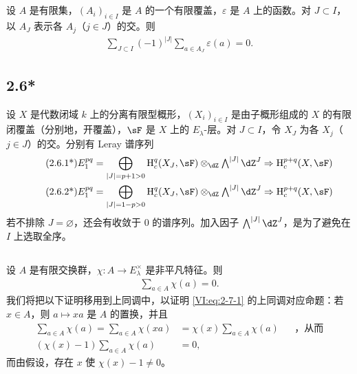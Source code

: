 \subsection{}\label{VI:2-6}

设 $A$ 是有限集，$(A_i)_{i\in I}$ 是 $A$ 的一个有限覆盖，$\varepsilon$ 是 $A$ 上的函数。对 $J\subset I$，以 $A_J$ 表示各 $A_j$（$j\in J$）的交。则
\begin{align*}\tag{2.6.1}\label{VI:eq:2-6-1}
  \sum_{J\subset I} (-1)^{|J|} \sum_{a\in A_J} \varepsilon(a) = 0 \text{.}
\end{align*}

\subsection*{2.6*}\label{VI:2-6*}

设 $X$ 是代数闭域 $k$ 上的分离有限型概形，$(X_i)_{i\in I}$ 是由子概形组成的 $X$ 的有限闭覆盖（分别地，开覆盖），$\sF$ 是 $X$ 上的 $E_\lambda$-层。对 $J\subset I$，令 $X_J$ 为各 $X_j$（$j\in J$）的交。分别有 Leray 谱序列
\begin{align*}\tag{2.6.1*}\label{VI:eq:2-6-1*}
  E_1^{p q} &= \bigoplus_{|J|=p+1>0} \h_c^q(X_J,\sF) \otimes_\dZ \textstyle\bigwedge^{|J|} \dZ^J \Rightarrow \h_c^{p+q}(X,\sF) \\
  \tag{2.6.2*}\label{VI:eq:2-6-2*}
  E_1^{p q} &= \bigoplus_{|J|=1-p>0} \h_c^q(X_J,\sF) \otimes_\dZ \textstyle\bigwedge^{|J|} \dZ^J \Rightarrow \h_c^{p+q}(X,\sF)
\end{align*}
若不排除 $J=\varnothing$，还会有收敛于 $0$ 的谱序列。加入因子 $\bigwedge^{|J|} \dZ^J$，是为了避免在 $I$ 上选取全序。

\subsection{}\label{VI:2-7}

设 $A$ 是有限交换群，$\chi:A \to E_\lambda^\times$ 是非平凡特征。则
\begin{align*}\tag{2.7.1}\label{VI:eq:2-7-1}
  \sum_{a\in A} \chi(a) = 0 \text{.}
\end{align*}
我们将把以下证明移用到上同调中，以证明 \eqref{VI:eq:2-7-1} 的上同调对应命题：若 $x\in A$，则 $a\mapsto x a$ 是 $A$ 的置换，并且
\begin{align*}
  \sum_{a\in A}\chi(a) = \sum_{a\in A} \chi(x a) &= \chi(x) \sum_{a\in A} \chi(a) && \text{，从而} \\
  (\chi(x)-1)\sum_{a\in A}\chi(a) &= 0 \text{,}
\end{align*}
而由假设，存在 $x$ 使 $\chi(x)-1\ne 0$。

